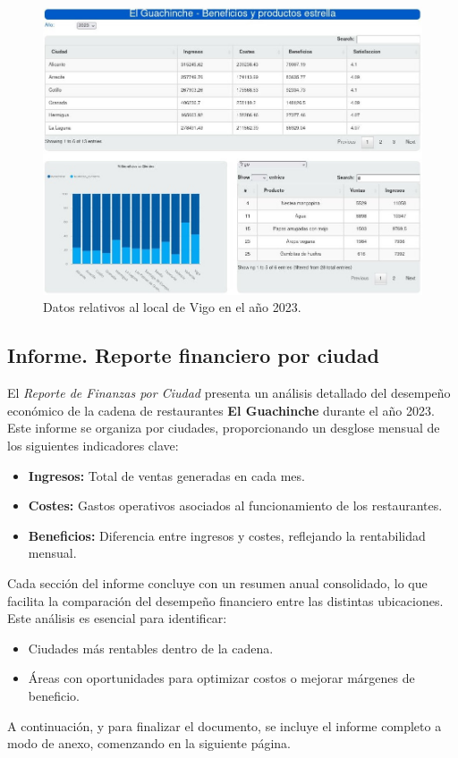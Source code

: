 \documentclass[11pt]{opticajnl}
\begin{document}
\begin{figure}[H]
    \centering
    \includegraphics[height=0.44\textheight]{fotos/cuadro/2023-vigo-g.jpg}
    \caption{Datos relativos al local de Vigo en el año 2023.}
    \label{fig:cuadro-vigo}
\end{figure}

\subsection{Informe. Reporte financiero por ciudad}

El \textit{Reporte de Finanzas por Ciudad} presenta un análisis detallado del desempeño económico de la cadena de restaurantes \textbf{El Guachinche} durante el año 2023. Este informe se organiza por ciudades, proporcionando un desglose mensual de los siguientes indicadores clave:

\begin{itemize}
    \item \textbf{Ingresos:} Total de ventas generadas en cada mes.
    \item \textbf{Costes:} Gastos operativos asociados al funcionamiento de los restaurantes.
    \item \textbf{Beneficios:} Diferencia entre ingresos y costes, reflejando la rentabilidad mensual.
\end{itemize}

Cada sección del informe concluye con un resumen anual consolidado, lo que facilita la comparación del desempeño financiero entre las distintas ubicaciones. Este análisis es esencial para identificar:
\begin{itemize}
    \item Ciudades más rentables dentro de la cadena.
    \item Áreas con oportunidades para optimizar costos o mejorar márgenes de beneficio.
\end{itemize}

A continuación, y para finalizar el documento, se incluye el informe completo a modo de anexo, comenzando en la siguiente página.



\end{document}
